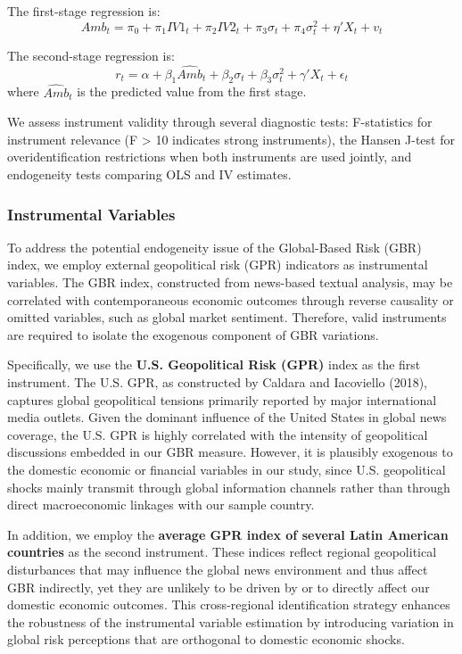 \documentclass[preprint,12pt,authoryear]{elsarticle}
\begin{document}
The first-stage regression is:
\begin{equation}
Amb_t = \pi_0 + \pi_1 IV1_t + \pi_2 IV2_t + \pi_3 \sigma_t + \pi_4 \sigma_t^2 + \eta' X_t + v_t
\end{equation}

The second-stage regression is:
\begin{equation}
r_t = \alpha + \beta_1 \widehat{Amb}_t + \beta_2 \sigma_t + \beta_3 \sigma_t^2 + \gamma' X_t + \epsilon_t
\end{equation}
where $\widehat{Amb}_t$ is the predicted value from the first stage.

We assess instrument validity through several diagnostic tests: F-statistics for instrument relevance (F > 10 indicates strong instruments), the Hansen J-test for overidentification restrictions when both instruments are used jointly, and endogeneity tests comparing OLS and IV estimates.

\subsubsection{Instrumental Variables}

To address the potential endogeneity issue of the Global-Based Risk (GBR) index, we employ external geopolitical risk (GPR) indicators as instrumental variables. The GBR index, constructed from news-based textual analysis, may be correlated with contemporaneous economic outcomes through reverse causality or omitted variables, such as global market sentiment. Therefore, valid instruments are required to isolate the exogenous component of GBR variations.

Specifically, we use the \textbf{U.S. Geopolitical Risk (GPR)} index as the first instrument. The U.S. GPR, as constructed by Caldara and Iacoviello (2018), captures global geopolitical tensions primarily reported by major international media outlets. Given the dominant influence of the United States in global news coverage, the U.S. GPR is highly correlated with the intensity of geopolitical discussions embedded in our GBR measure. However, it is plausibly exogenous to the domestic economic or financial variables in our study, since U.S. geopolitical shocks mainly transmit through global information channels rather than through direct macroeconomic linkages with our sample country.

In addition, we employ the \textbf{average GPR index of several Latin American countries} as the second instrument. These indices reflect regional geopolitical disturbances that may influence the global news environment and thus affect GBR indirectly, yet they are unlikely to be driven by or to directly affect our domestic economic outcomes. This cross-regional identification strategy enhances the robustness of the instrumental variable estimation by introducing variation in global risk perceptions that are orthogonal to domestic economic shocks.
\end{document}

